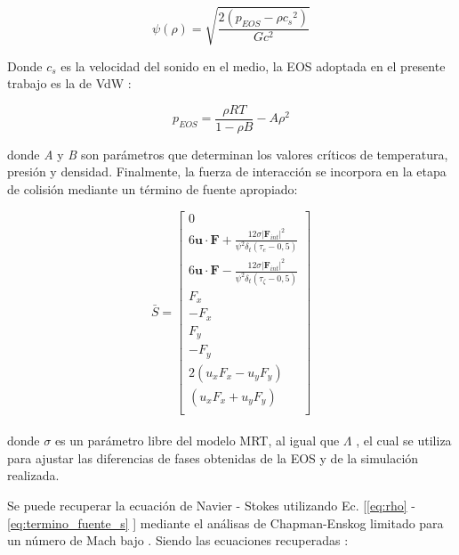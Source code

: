\begin{equation} 
    \psi(\rho) = \sqrt{\frac{2 (p_{EOS} - \rho {c_{s}}^{2})}{G {c}^{2}}}
    \label{eq:psi}
\end{equation}

Donde $c_{s}$ es la velocidad del sonido en el medio, la EOS adoptada en el presente trabajo es la de VdW :

\begin{equation}
    p_{EOS} = \frac{\rho R T}{1- \rho B} - A {\rho}^{2}
\end{equation}

donde \textit{A} y \textit{B} son parámetros que determinan los valores críticos de temperatura, presión y densidad. Finalmente, la fuerza de interacción se incorpora en la etapa de colisión mediante un término de fuente apropiado:


\begin{equation}
    \bar{S} = 
    \left[ \begin{array}{c} 
        0\\
        6 \mathbf{u}\cdot \mathbf{F} + \frac{12 \sigma {|{\mathbf{F}_{int}|}}^{2} }{{\psi}^{2} \delta_{t} (\tau_{e} - 0,5)}\\
        6 \mathbf{u}\cdot \mathbf{F} - \frac{12 \sigma {|{\mathbf{F}_{int}|}}^{2} }{{\psi}^{2} \delta_{t} (\tau_{\zeta } - 0,5)}\\
        F_{x}\\
        -F_{x}\\
        F_{y}\\
        -F_{y}\\
        2(u_{x} F_{x} - u_{y} F_{y} )\\
        (u_{x} F_{x} + u_{y} F_{y} )\\              
    \end{array}
    \right]    
    \label{eq:termino_fuente_s}
\end{equation}
\\
donde $\sigma$ es un parámetro libre del modelo MRT, al igual que $\Lambda$ , el cual se utiliza para ajustar las diferencias de fases obtenidas de la EOS y de la simulación realizada.

Se puede recuperar la ecuación de Navier - Stokes utilizando Ec. [\ref{eq:rho} - \ref{eq:termino_fuente_s} ] mediante el análisas de Chapman-Enskog limitado para un número de Mach bajo \cite{li2013lattice}. Siendo las ecuaciones recuperadas \cite{fogliatto2019simulation} \cite{li2013lattice}:

